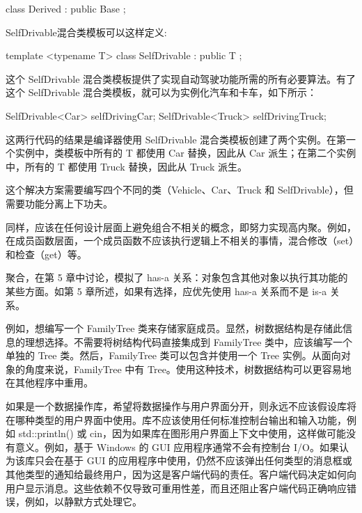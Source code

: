 \begin{cpp}
class Derived : public Base {};
\end{cpp}

SelfDrivable混合类模板可以这样定义:

\begin{cpp}
template <typename T>
class SelfDrivable : public T
{
};
\end{cpp}

这个 SelfDrivable 混合类模板提供了实现自动驾驶功能所需的所有必要算法。有了这个 SelfDrivable 混合类模板，就可以为实例化汽车和卡车，如下所示：


\begin{cpp}
SelfDrivable<Car> selfDrivingCar;
SelfDrivable<Truck> selfDrivingTruck;
\end{cpp}

这两行代码的结果是编译器使用 SelfDrivable 混合类模板创建了两个实例。在第一个实例中，类模板中所有的 T 都使用 Car 替换，因此从 Car 派生；在第二个实例中，所有的 T 都使用 Truck 替换，因此从 Truck 派生。

这个解决方案需要编写四个不同的类（Vehicle、Car、Truck 和 SelfDrivable），但需要功能分离上下功夫。

同样，应该在任何设计层面上避免组合不相关的概念，即努力实现高内聚。例如，在成员函数层面，一个成员函数不应该执行逻辑上不相关的事情，混合修改（set）和检查（get）等。


聚合，在第 5 章中讨论，模拟了 has-a 关系：对象包含其他对象以执行其功能的某些方面。如第 5 章所述，如果有选择，应优先使用 has-a 关系而不是 is-a 关系。

例如，想编写一个 FamilyTree 类来存储家庭成员。显然，树数据结构是存储此信息的理想选择。不需要将树结构代码直接集成到 FamilyTree 类中，应该编写一个单独的 Tree 类。然后，FamilyTree 类可以包含并使用一个 Tree 实例。从面向对象的角度来说，FamilyTree 中有 Tree。使用这种技术，树数据结构可以更容易地在其他程序中重用。


如果是一个数据操作库，希望将数据操作与用户界面分开，则永远不应该假设库将在哪种类型的用户界面中使用。库不应该使用任何标准控制台输出和输入功能，例如 std::println() 或 cin，因为如果库在图形用户界面上下文中使用，这样做可能没有意义。例如，基于 Windows 的 GUI 应用程序通常不会有控制台 I/O。如果认为该库只会在基于 GUI 的应用程序中使用，仍然不应该弹出任何类型的消息框或其他类型的通知给最终用户，因为这是客户端代码的责任。客户端代码决定如何向用户显示消息。这些依赖不仅导致可重用性差，而且还阻止客户端代码正确响应错误，例如，以静默方式处理它。

